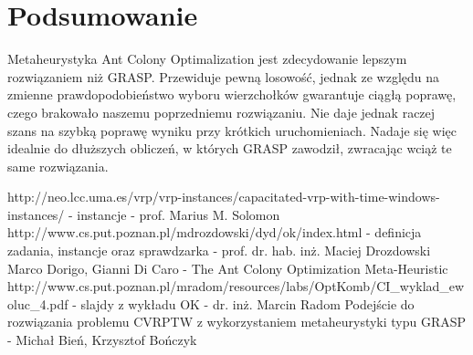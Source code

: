 \documentclass[a4paper]{article}
\begin{document}
\section{Podsumowanie}
Metaheurystyka Ant Colony Optimalization jest zdecydowanie lepszym rozwiązaniem niż GRASP. Przewiduje pewną losowość, jednak ze względu na zmienne prawdopodobieństwo wyboru wierzchołków gwarantuje ciągłą poprawę, czego brakowało naszemu poprzedniemu rozwiązaniu. Nie daje jednak raczej szans na szybką poprawę wyniku przy krótkich uruchomieniach. Nadaje się więc idealnie do dłuższych obliczeń, w których GRASP zawodził, zwracając wciąż te same rozwiązania.

\begin{thebibliography}{5}
 http://neo.lcc.uma.es/vrp/vrp-instances/capacitated-vrp-with-time-windows-instances/ - instancje - prof. Marius M. Solomon
 http://www.cs.put.poznan.pl/mdrozdowski/dyd/ok/index.html - definicja zadania, instancje oraz sprawdzarka - prof. dr. hab. inż. Maciej Drozdowski
 Marco Dorigo, Gianni Di Caro - The Ant Colony Optimization Meta-Heuristic
 http://www.cs.put.poznan.pl/mradom/resources/labs/OptKomb/CI\_wyklad\_ewoluc\_4.pdf - slajdy z wykładu OK - dr. inż. Marcin Radom
 Podejście do rozwiązania problemu CVRPTW z wykorzystaniem metaheurystyki typu GRASP - Michał Bień, Krzysztof Bończyk
\end{thebibliography}
\pagebreak
\end{document}
